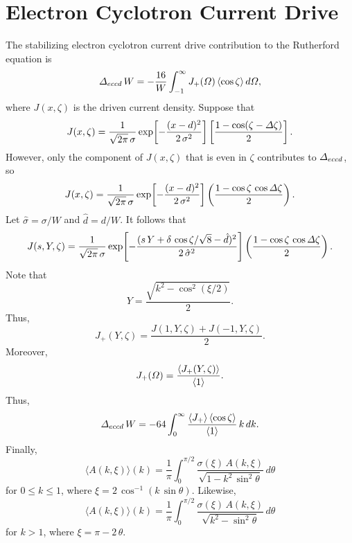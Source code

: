 \documentclass[12pt,prb,aps,notitlepage]{revtex4-1}
\begin{document}
\section{Electron Cyclotron Current Drive}
The stabilizing electron cyclotron current drive contribution to the Rutherford equation is
\begin{equation}
{\mit\Delta}_{eccd} \,W= -\frac{16}{W}\int_{-1}^\infty J_+({\mit\Omega})\,\langle\cos\zeta\rangle\,d{\mit\Omega},
\end{equation}
where $J(x,\zeta)$ is the driven current density. Suppose that
\begin{equation}
J(x,\zeta)= \frac{1}{\sqrt{2\pi}\,\sigma}\exp\!\left[-\frac{(x-d)^2}{2\,\sigma^2}\right]\left[\frac{1-\cos(\zeta-{\mit\Delta}\zeta)}{2}\right].
\end{equation}
However, only the component of $J(x,\zeta)$ that is even in $\zeta$ contributes to ${\mit\Delta}_{eccd}$, so 
\begin{equation}
J(x,\zeta)= \frac{1}{\sqrt{2\pi}\,\sigma}\exp\!\left[-\frac{(x-d)^2}{2\,\sigma^2}\right]\left(\frac{1-\cos\zeta\,\cos{\mit\Delta}\zeta}{2}\right).
\end{equation}
Let $\hat{\sigma}=\sigma/W$ and $\hat{d}=d/W$.  It follows that
\begin{equation}
J(s,Y,\zeta) =  \frac{1}{\sqrt{2\pi}\,\sigma}\exp\!\left[-\frac{(s\,Y+\delta\,\cos\zeta/\sqrt{8}-\hat{d})^2}{2\,\hat{\sigma}^2}\right]\left(\frac{1-\cos\zeta\,\cos{\mit\Delta}\zeta}{2}\right).
\end{equation}
Note that 
\begin{equation}
Y = \frac{\sqrt{k^2-\cos^2(\xi/2)}}{2}.
\end{equation}
Thus,
\begin{equation}
J_+(Y,\zeta) = \frac{J(1,Y,\zeta) + J(-1,Y,\zeta)}{2}.
\end{equation}
Moreover, 
\begin{equation}
J_+({\mit\Omega}) = \frac{\langle J_+(Y,\zeta)\rangle}{\langle 1\rangle}.
\end{equation}
Thus,
\begin{equation}
{\mit\Delta}_{eccd} \,W= -64\int_0^\infty \frac{\langle J_+\rangle\,\langle\cos\zeta\rangle}{\langle 1\rangle}\,k\,dk.
\end{equation}
Finally,
\begin{equation}
\langle A(k,\xi)\rangle(k) = \frac{1}{\pi}\int_0^{\pi/2}\frac{\sigma(\xi)\,A(k,\xi)}{\sqrt{1-k^2\,\sin^2\theta}}\,d\theta
\end{equation}
for $0\leq k\leq 1$, where $\xi=2\,\cos^{-1}(k\,\sin\theta)$. Likewise, 
\begin{equation}
\langle A(k,\xi)\rangle(k) = \frac{1}{\pi}\int_0^{\pi/2}\frac{\sigma(\xi)\,A(k,\xi)}{\sqrt{k^2-\sin^2\theta}}\,d\theta
\end{equation}
for $k>1$, where $\xi=\pi-2\,\theta$.
\end{document}
